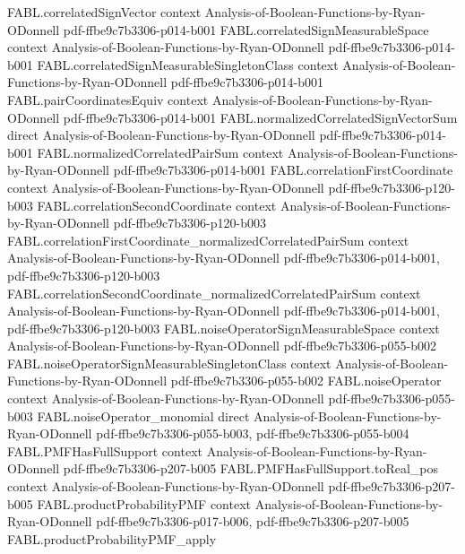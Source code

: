 \begin{theorem}
\proofstep
  {FABL.correlatedSignVector}
  {context}
  {Analysis-of-Boolean-Functions-by-Ryan-ODonnell}
  {pdf-ffbe9c7b3306-p014-b001}
\proofstep
  {FABL.correlatedSignMeasurableSpace}
  {context}
  {Analysis-of-Boolean-Functions-by-Ryan-ODonnell}
  {pdf-ffbe9c7b3306-p014-b001}
\proofstep
  {FABL.correlatedSignMeasurableSingletonClass}
  {context}
  {Analysis-of-Boolean-Functions-by-Ryan-ODonnell}
  {pdf-ffbe9c7b3306-p014-b001}
\proofstep
  {FABL.pairCoordinatesEquiv}
  {context}
  {Analysis-of-Boolean-Functions-by-Ryan-ODonnell}
  {pdf-ffbe9c7b3306-p014-b001}
\proofstep
  {FABL.normalizedCorrelatedSignVectorSum}
  {direct}
  {Analysis-of-Boolean-Functions-by-Ryan-ODonnell}
  {pdf-ffbe9c7b3306-p014-b001}
\proofstep
  {FABL.normalizedCorrelatedPairSum}
  {context}
  {Analysis-of-Boolean-Functions-by-Ryan-ODonnell}
  {pdf-ffbe9c7b3306-p014-b001}
\proofstep
  {FABL.correlationFirstCoordinate}
  {context}
  {Analysis-of-Boolean-Functions-by-Ryan-ODonnell}
  {pdf-ffbe9c7b3306-p120-b003}
\proofstep
  {FABL.correlationSecondCoordinate}
  {context}
  {Analysis-of-Boolean-Functions-by-Ryan-ODonnell}
  {pdf-ffbe9c7b3306-p120-b003}
\proofstep
  {FABL.correlationFirstCoordinate_normalizedCorrelatedPairSum}
  {context}
  {Analysis-of-Boolean-Functions-by-Ryan-ODonnell}
  {pdf-ffbe9c7b3306-p014-b001,
    pdf-ffbe9c7b3306-p120-b003}
\proofstep
  {FABL.correlationSecondCoordinate_normalizedCorrelatedPairSum}
  {context}
  {Analysis-of-Boolean-Functions-by-Ryan-ODonnell}
  {pdf-ffbe9c7b3306-p014-b001,
    pdf-ffbe9c7b3306-p120-b003}
\proofstep
  {FABL.noiseOperatorSignMeasurableSpace}
  {context}
  {Analysis-of-Boolean-Functions-by-Ryan-ODonnell}
  {pdf-ffbe9c7b3306-p055-b002}
\proofstep
  {FABL.noiseOperatorSignMeasurableSingletonClass}
  {context}
  {Analysis-of-Boolean-Functions-by-Ryan-ODonnell}
  {pdf-ffbe9c7b3306-p055-b002}
\proofstep
  {FABL.noiseOperator}
  {context}
  {Analysis-of-Boolean-Functions-by-Ryan-ODonnell}
  {pdf-ffbe9c7b3306-p055-b003}
\proofstep
  {FABL.noiseOperator_monomial}
  {direct}
  {Analysis-of-Boolean-Functions-by-Ryan-ODonnell}
  {pdf-ffbe9c7b3306-p055-b003,
    pdf-ffbe9c7b3306-p055-b004}
\proofstep
  {FABL.PMFHasFullSupport}
  {context}
  {Analysis-of-Boolean-Functions-by-Ryan-ODonnell}
  {pdf-ffbe9c7b3306-p207-b005}
\proofstep
  {FABL.PMFHasFullSupport.toReal_pos}
  {context}
  {Analysis-of-Boolean-Functions-by-Ryan-ODonnell}
  {pdf-ffbe9c7b3306-p207-b005}
\proofstep
  {FABL.productProbabilityPMF}
  {context}
  {Analysis-of-Boolean-Functions-by-Ryan-ODonnell}
  {pdf-ffbe9c7b3306-p017-b006,
    pdf-ffbe9c7b3306-p207-b005}
\proofstep
  {FABL.productProbabilityPMF_apply}

\end{theorem}
